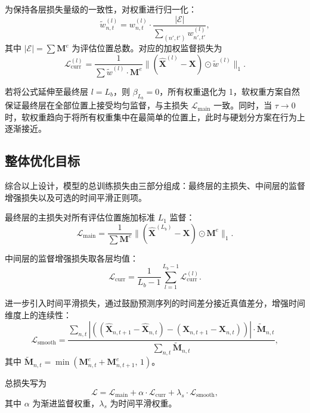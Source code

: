 为保持各层损失量级的一致性，对权重进行归一化：
\begin{equation}
\tilde{w}^{(l)}_{n,t} = w^{(l)}_{n,t} \cdot \frac{|\mathcal{E}|}{\sum_{(n',t')} w^{(l)}_{n',t'}},
\end{equation}
其中 $|\mathcal{E}| = \sum \mathbf{M}^{e}$ 为评估位置总数。对应的加权监督损失为
\begin{equation}
\mathcal{L}^{(l)}_{\mathrm{curr}} = \frac{1}{\sum \tilde{w}^{(l)} \cdot \mathbf{M}^{e}} \bigl\|(\hat{\mathbf{X}}^{(l)} - \mathbf{X}) \odot \tilde{w}^{(l)}\bigr\|_1.
\end{equation}

若将公式延伸至最终层 $l=L_b$，则 $\beta_{L_b}=0$，所有权重退化为 1，软权重方案自然保证最终层在全部位置上接受均匀监督，与主损失 $\mathcal{L}_{\mathrm{main}}$ 一致。同时，当 $\tau \to 0$ 时，软权重趋向于将所有权重集中在最简单的位置上，此时与硬划分方案在行为上逐渐接近。

\subsection{整体优化目标}

综合以上设计，模型的总训练损失由三部分组成：最终层的主损失、中间层的监督增强损失以及可选的时间平滑正则项。

最终层的主损失对所有评估位置施加标准 $L_1$ 监督：
\begin{equation}
\mathcal{L}_{\mathrm{main}} = \frac{1}{\sum \mathbf{M}^{e}} \bigl\|(\hat{\mathbf{X}}^{(L_b)} - \mathbf{X}) \odot \mathbf{M}^{e}\bigr\|_1.
\end{equation}

中间层的监督增强损失取各层均值：
\begin{equation}
\mathcal{L}_{\mathrm{curr}} = \frac{1}{L_b - 1}\sum_{l=1}^{L_b-1} \mathcal{L}^{(l)}_{\mathrm{curr}}.
\end{equation}

进一步引入时间平滑损失，通过鼓励预测序列的时间差分接近真值差分，增强时间维度上的连续性：
\begin{equation}
\mathcal{L}_{\mathrm{smooth}} = \frac{\sum_{n,t} |((\hat{\mathbf{X}}_{n,t+1}-\hat{\mathbf{X}}_{n,t})-(\mathbf{X}_{n,t+1}-\mathbf{X}_{n,t}))| \cdot \tilde{\mathbf{M}}_{n,t}}{\sum_{n,t} \tilde{\mathbf{M}}_{n,t}},
\end{equation}
其中 $\tilde{\mathbf{M}}_{n,t} = \min(\mathbf{M}^{e}_{n,t} + \mathbf{M}^{e}_{n,t+1},\, 1)$。

总损失写为
\begin{equation}\label{eq:total_loss}
\mathcal{L} = \mathcal{L}_{\mathrm{main}} + \alpha \cdot \mathcal{L}_{\mathrm{curr}} + \lambda_s \cdot \mathcal{L}_{\mathrm{smooth}},
\end{equation}
其中 $\alpha$ 为渐进监督权重，$\lambda_s$ 为时间平滑权重。


